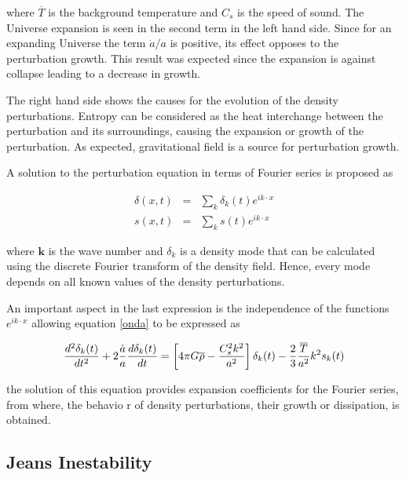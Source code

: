 where $\overline{T}$ is the background temperature and $C_s$ is the speed of sound.
The Universe expansion is seen in the second term in the left hand side. Since for an expanding
Universe the term $\dot{a}/{a}$ is positive, its effect opposes to the 
perturbation growth. This result was expected since the expansion is against collapse leading to a decrease in growth. 	

The right hand side shows the causes for the evolution of the density perturbations. 
Entropy can be considered as the heat interchange between the perturbation and 
its surroundings, causing the expansion or growth of the perturbation. As expected, 
gravitational field is a source for perturbation growth. 

A solution to the perturbation equation in terms of Fourier series is proposed as

\begin{eqnarray}
\delta(x,t) &=& \sum_k \delta_k(t)e^{ik\cdot x} \nonumber\\
s(x,t) &=& \sum_k s(t)e^{ik\cdot x} \nonumber
\end{eqnarray}

where $\textbf{k}$ is the wave number and $\delta_k$ is 
a density mode that can be calculated using the discrete Fourier transform
of the density field. Hence, every mode depends on all known values
of the density perturbations. 

An important aspect in the last expression is the independence of the 
functions $e^{ik\cdot x}$ allowing equation \ref{onda} to be expressed as 

\begin{equation}
\frac{d^2\delta_k(t)}{dt^2}+2\frac{\dot{a}}{a}\frac{d \delta_k(t)}{d t} = 
\left[4\pi G\overline{\rho}-\frac{C_s^2 k^2}{a^2}\right]\delta_k(t)
-\frac{2}{3}\frac{\overline{T}}{a^2}k^2s_k(t)
\label{ec.modos}
\end{equation}

the solution of this equation provides expansion coefficients for the Fourier series,
from where, the behavio	r of density perturbations, their growth or 
dissipation, is obtained. 

\subsection{ Jeans Inestability}

